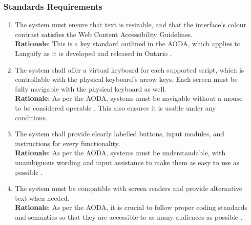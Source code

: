 \subsubsection{Standards Requirements}
\label{ssub:standards_requirements}
\begin{enumerate}[{LR-STD}1. ]
	\item The system must ensure that text is resizable, and that the interface’s colour contrast satisfies the Web Content Accessibility Guidelines.
	\\ \textbf{Rationale}: This is a key standard outlined in the AODA, which applies to Languify as it is developed and released in Ontario \cite{10}.
	\item The system shall offer a virtual keyboard for each supported script, which is controllable with the physical keyboard’s arrow keys. Each screen must be fully navigable with the physical keyboard as well.
	\\ \textbf{Rationale}: As per the AODA, systems must be navigable without a mouse to be considered operable \cite{10}. This also ensures it is usable under any conditions.
	\item The system shall provide clearly labelled buttons, input modules, and instructions for every functionality.
	\\ \textbf{Rationale}: As per the AODA, systems must be understandable, with unambiguous wording and input assistance to make them as easy to use as possible \cite{9}.
	\item The system must be compatible with screen readers and provide alternative text when needed.
	\\ \textbf{Rationale}: As per the AODA, it is crucial to follow proper coding standards and semantics so that they are accessible to as many audiences as possible \cite{9}.
\end{enumerate}


